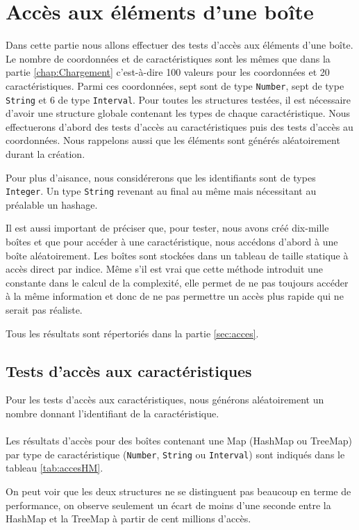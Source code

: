 \section{Accès aux éléments d'une boîte}
Dans cette partie nous allons effectuer des tests d'accès aux éléments d'une boîte. Le nombre de coordonnées et de caractéristiques sont les mêmes que dans la partie \ref{chap:Chargement} c'est-à-dire 100 valeurs pour les coordonnées et 20 caractéristiques. Parmi ces coordonnées, sept sont de type \verb+Number+, sept de type \verb+String+ et 6 de type \verb+Interval+. Pour toutes les structures testées, il est nécessaire d'avoir une structure globale contenant les types de chaque caractéristique. Nous effectuerons d'abord des tests d'accès au caractéristiques puis des tests d'accès au coordonnées. Nous rappelons aussi que les éléments sont générés aléatoirement durant la création.

Pour plus d'aisance, nous considérerons que les identifiants sont de types \verb+Integer+. Un type \verb+String+ revenant au final au même mais nécessitant au préalable un hashage.

Il est aussi important de préciser que, pour tester, nous avons créé dix-mille boîtes et que pour accéder à une caractéristique, nous accédons d'abord à une boîte aléatoirement. Les boîtes sont stockées dans un tableau de taille statique à accès direct par indice. Même s'il est vrai que cette méthode introduit une constante dans le calcul de la complexité, elle permet de ne pas toujours accéder à la même information et donc de ne pas permettre un accès plus rapide qui ne serait pas réaliste.

Tous les résultats sont répertoriés dans la partie \ref{sec:acces}.

\subsection{Tests d'accès aux caractéristiques}
Pour les tests d'accès aux caractéristiques, nous générons aléatoirement un nombre donnant l'identifiant de la caractéristique.

\paragraph{} Les résultats d'accès pour des boîtes contenant une Map (HashMap ou TreeMap) par type de caractéristique (\verb+Number+, \verb+String+ ou \verb+Interval+) sont indiqués dans le tableau \ref{tab:accesHM}.

On peut voir que les deux structures ne se distinguent pas beaucoup en terme de performance, on observe seulement un écart de moins d'une seconde entre la HashMap et la TreeMap à partir de cent millions d'accès.


